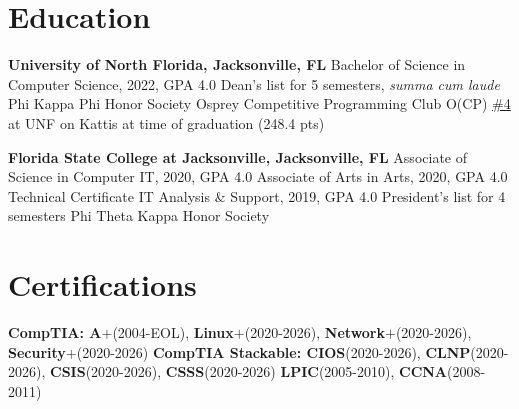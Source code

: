 \documentclass[10pt]{report}
\begin{document}
\section*{Education}
\vspace{-1em}
\setlength{\columnsep}{-2em}
\begin{multicols}{2}
\textbf{University of North Florida, Jacksonville, FL} \newline
Bachelor of Science in Computer Science, 2022, GPA 4.0 \newline
Dean's list for 5 semesters, \textit{summa cum laude} \newline
Phi Kappa Phi Honor Society \newline
Osprey Competitive Programming Club O(CP) \newline
\href{https://open.kattis.com/universities/unf.edu}{\#4} at UNF on Kattis at time of graduation (248.4 pts)
\columnbreak

\textbf{Florida State College at Jacksonville, Jacksonville, FL} \newline
Associate of Science in Computer IT, 2020, GPA 4.0 \newline
Associate of Arts in Arts, 2020, GPA 4.0 \newline
Technical Certificate IT Analysis \& Support, 2019, GPA 4.0 \newline
President's list for 4 semesters \newline
Phi Theta Kappa Honor Society
\end{multicols}
\vspace{-1em}


\section*{Certifications}
\textbf{CompTIA: A$\bm{+}$}(2004-EOL), \textbf{Linux$\bm{+}$}(2020-2026), \textbf{Network$\bm{+}$}(2020-2026), \textbf{Security$\bm{+}$}(2020-2026)\newline
\textbf{CompTIA Stackable: CIOS}(2020-2026), \textbf{CLNP}(2020-2026), \textbf{CSIS}(2020-2026), \textbf{CSSS}(2020-2026)\newline
\textbf{LPIC}(2005-2010), \textbf{CCNA}(2008-2011)
\end{document}
